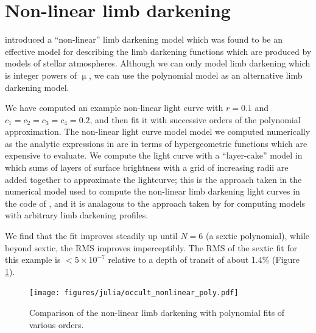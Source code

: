 \documentclass[modern]{aastex61}
\begin{document}
\section{Non-linear limb darkening}\label{sec:nonlinear}

\citet{Claret2000} introduced a ``non-linear'' limb darkening model which
was found to be an effective model for describing the limb darkening functions
which are produced by models of stellar atmospheres.
Although we can only model limb darkening which is integer powers of $\upmu$,
we can use the polynomial model as an alternative limb darkening model.


We have computed an example non-linear light curve with $r=0.1$ and
$c_1=c_2=c_3=c_4=0.2$, and then fit it with successive orders of the
polynomial approximation.  The non-linear light curve model model
we computed numerically as the analytic expressions in \citet{MandelAgol2002}
are in terms of hypergeometric functions which are expensive to evaluate.  
We compute the light curve with a ``layer-cake'' model in which sums of 
layers of surface brightness with a grid of increasing radii are added together 
to approximate the lightcurve;  this
is the approach taken in the numerical model used to compute the
non-linear limb darkening light curves in the code of \citet{MandelAgol2002},
and it is analagous to the approach taken by \citet{Kreidberg2015} for
computing models with arbitrary limb darkening profiles.

We find that the fit improves steadily up until $N=6$ (a sextic
polynomial), while beyond sextic, the RMS improves imperceptibly.
The RMS of the sextic fit for this example is $<5 \times 10^{-7}$
relative to a depth of transit of about 1.4\% (Figure \ref{fig:nonlinear}).

\begin{figure}
    \begin{centering}
    \texttt{[image: figures/julia/occult\_nonlinear\_poly.pdf]}
    \caption{Comparison of the non-linear limb darkening with polynomial
    fits of various orders. 
    \label{fig:nonlinear}}
    \end{centering}
\end{figure}
\end{document}
